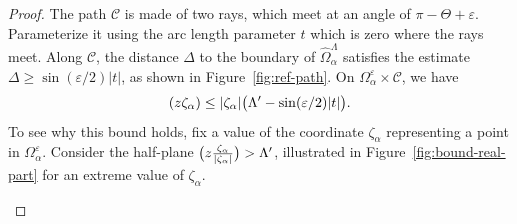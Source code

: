 \documentclass[10pt,a4paper]{amsart}
\let\Re\relax
\DeclareMathOperator{\Re}{Re}
\numberwithin{equation}{section}
\newcommand{\setfiberscale}[1]{
  \pgfmathsetmacro{\rfiber}{#1}
  \pgfmathsetmacro{\rshade}{1.5*\rfiber}
}
\newcommand{\drawfiber}{
  \foreach \sgn in {-1, 1} {
    \calligraphy[scale=\sgn, copperplate, heavy, heavy line width=0.25mm]
      (\rfiber, \rfiber) -- (\rfiber, -\rfiber)
      (\rfiber, -\rfiber) -- (-\rfiber, -\rfiber);
  }%
}
\newcommand{\fiberdescender}[1]{
  \calligraphy[copperplate, light, thin] (0, -\rfiber) -- (0, -#1);
}
\newcommand{\fibershading}[2]{
  \tikzmath{
    \shadestart = (-90 - #1) / \fiberdeg;
    \shadeend = (90 - #1) / \fiberdeg;
  }
  \fill[pwbeige!30, draw=pwbeige!60] (0, 0) ++(-#1:#2) -- ++(\shadestart:\rshade) arc (\shadestart:\shadeend:\rshade) -- cycle;
}
\newenvironment{fiber}[1][]{%
  \pgfkeys{/laplace/.cd, drop=0, shade=false, degree=1, phase=0, dis=0, #1}
  \begin{scope}
    \fill[surf] (-\rfiber, -\rfiber) rectangle (\rfiber, \rfiber);
    \clip (-\rfiber, -\rfiber) rectangle (\rfiber, \rfiber);
    \tikzmath{
      if \fibershade then {
        print \fibershading{\fiberphase}{\fiberdis};
      };
    }
}{%
  \end{scope}
  \tikzmath{
    if \fiberdrop > 0 then {
      print \fiberdescender{\fiberdrop};
    };
  }
  \drawfiber
}
\begin{document}
\begin{proof}
\noindent
The path $\mathcal{C}$ is made of two rays, which meet at an angle of $\pi - \Theta + \varepsilon$. Parameterize it using the arc length parameter $t$ which is zero where the rays meet. Along $\mathcal{C}$, the distance $\Delta$ to the boundary of $\widehat{\Omega}_\alpha^\Lambda$ satisfies the estimate
$\Delta \ge \sin(\varepsilon/2) |t|$,
as shown in Figure~\ref{fig:ref-path}. On $\Omega_\alpha^\varepsilon \times \mathcal{C}$, we have
\begin{equation}\label{eqn:inverse-laplace-exp-bound}
\Re(z\zeta_\alpha) \le |\zeta_\alpha| \bigl(\Lambda' - \sin(\varepsilon/2) |t|\bigr).
\end{equation}
To see why this bound holds, fix a value of the coordinate $\zeta_\alpha$ representing a point in $\Omega_\alpha^\varepsilon$. Consider the half-plane $\Re\bigl(z \frac{\zeta_\alpha}{|\zeta_\alpha|}\bigr) > \Lambda'$, illustrated in Figure~\ref{fig:bound-real-part} for an extreme value of $\zeta_\alpha$.
\begin{figure}[!ht]\centering
{}
\end{figure}
\end{proof}
\end{document}
